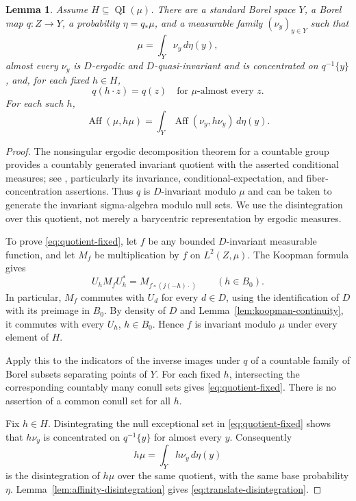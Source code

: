 \documentclass[11pt]{article}
\numberwithin{equation}{section}
\newtheorem{lemma}[theorem]{Lemma}
\theoremstyle{definition}
\newcommand{\Aff}{\operatorname{Aff}}
\newcommand{\QI}{\operatorname{QI}}
\begin{document}
\begin{lemma}\label{lem:fixed-quotient}
Assume $H\subseteq\QI(\mu)$. There are a standard Borel space $Y$, a
Borel map $q:Z\to Y$, a probability $\eta=q_*\mu$, and a measurable
family $(\nu_y)_{y\in Y}$ such that
\[
 \mu=\int_Y\nu_y\,d\eta(y),
\]
almost every $\nu_y$ is $D$-ergodic and $D$-quasi-invariant and is
concentrated on $q^{-1}\{y\}$, and, for each fixed $h\in H$,
\begin{equation}\label{eq:quotient-fixed}
 q(h\cdot z)=q(z)\quad\text{for }\mu\text{-almost every }z.
\end{equation}
For each such $h$,
\begin{equation}\label{eq:translate-disintegration}
 \Aff(\mu,h\mu)
   =\int_Y\Aff(\nu_y,h\nu_y)\,d\eta(y).
\end{equation}
\end{lemma}

\begin{proof}
The nonsingular ergodic decomposition theorem for a countable group
provides a countably generated invariant quotient with the asserted
conditional measures; see \cite[Theorem~1.5]{GS}, particularly its
invariance, conditional-expectation, and fiber-concentration assertions.
Thus $q$ is $D$-invariant modulo $\mu$ and can be taken to generate
the invariant sigma-algebra modulo null sets. We use the disintegration
over this quotient, not merely a barycentric representation by ergodic
measures.

To prove \eqref{eq:quotient-fixed}, let $f$ be any bounded
$D$-invariant measurable function,
and let $M_f$ be multiplication by $f$ on $L^2(Z,\mu)$. The Koopman
formula gives
\[
 U_hM_fU_h^*=M_{f\circ(j(-h)\cdot)}\qquad(h\in B_0).
\]
In particular, $M_f$ commutes with $U_d$ for every $d\in D$, using
the identification of $D$ with its preimage in $B_0$. By density of
$D$ and Lemma~\ref{lem:koopman-continuity}, it commutes with every
$U_h$, $h\in B_0$. Hence $f$ is invariant modulo $\mu$ under every
element of $H$.

Apply this to the indicators of the inverse images under $q$ of a
countable family of Borel subsets separating points of $Y$. For each
fixed $h$, intersecting the corresponding countably many conull sets
gives \eqref{eq:quotient-fixed}. There is no assertion of a common
conull set for all $h$.

Fix $h\in H$. Disintegrating the null exceptional set in
\eqref{eq:quotient-fixed} shows
that $h\nu_y$ is concentrated on $q^{-1}\{y\}$ for almost every $y$.
Consequently
\[
 h\mu=\int_Y h\nu_y\,d\eta(y)
\]
is the disintegration of $h\mu$ over the same quotient, with the same
base probability $\eta$. Lemma~\ref{lem:affinity-disintegration} gives
\eqref{eq:translate-disintegration}.
\end{proof}
\end{document}
